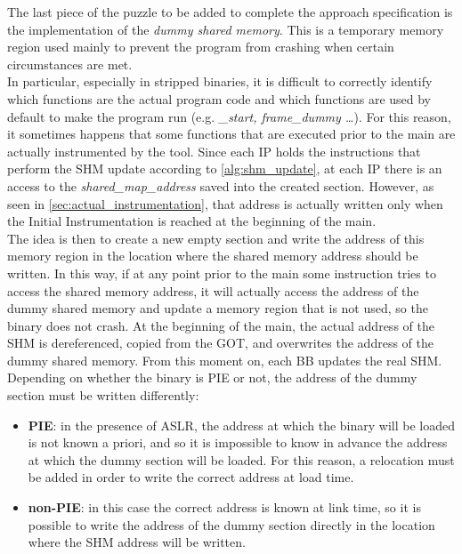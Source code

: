 The last piece of the puzzle to be added to complete the approach specification is the implementation of the 
\textit{dummy shared memory}. This is a temporary memory region used mainly to prevent the program from crashing 
when certain circumstances are met.\\
In particular, especially in stripped binaries, it is difficult to correctly identify which functions are the actual 
program code and which functions are used by default to make the program run (e.g. \textit{\_start, frame\_dummy \dots}).
For this reason, it sometimes happens that some functions that are executed prior to the main are actually instrumented 
by the tool.
Since each \gls{IP} holds the instructions that perform the \gls{SHM} update according to \cref{alg:shm_update}, 
at each \gls{IP} there is an access to the \textit{shared\_map\_address} saved into the created section.
However, as seen in \cref{sec:actual_instrumentation}, that address is actually written only when the Initial Instrumentation 
is reached at the beginning of the main.\\
The idea is then to create a new empty section and write the address of this memory region in the location where 
the shared memory address should be written.
In this way, if at any point prior to the main some instruction tries to access the shared memory address, it will 
actually access the address of the dummy shared memory and update a memory region that is not used, so the binary 
does not crash.
At the beginning of the main, the actual address of the \gls{SHM} is dereferenced, copied from the \gls{GOT}, and 
overwrites the address of the dummy shared memory. From this moment on, each \gls{BB} updates the real \gls{SHM}.\\
Depending on whether the binary is \gls{PIE} or not, the address of the dummy section must be written differently:
\begin{itemize}
\item \textbf{\gls{PIE}}: in the presence of \gls{ASLR}, the address at which the binary will be loaded is not known a priori, 
            and so it is impossible to know in advance the address at which the dummy section will be loaded.
            For this reason, a relocation must be added in order to write the correct address at load time.
\item \textbf{non-\gls{PIE}}: in this case the correct address is known at link time, so it is possible to write 
        the address of the dummy section directly in the location where the \gls{SHM} address will be written.
\end{itemize}